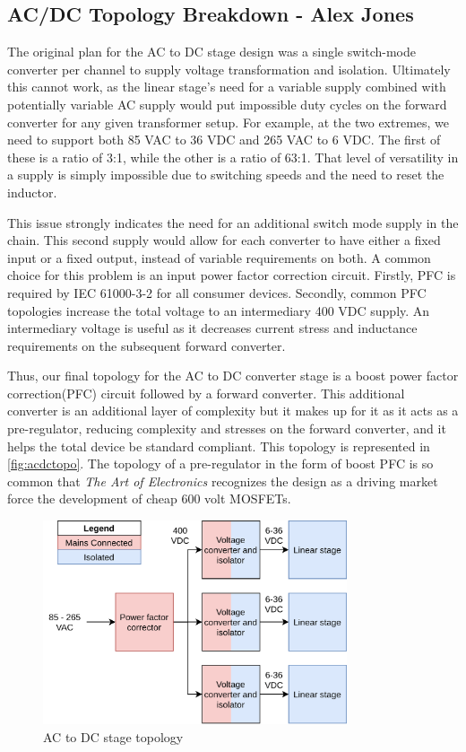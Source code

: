 \documentclass[15pt]{article}
\begin{document}
\pagebreak
\subsection{AC/DC Topology Breakdown - Alex Jones}
The original plan for the AC to DC stage design was a single switch-mode converter per channel to supply voltage transformation and isolation. Ultimately this cannot work, as the linear stage’s need for a variable supply combined with potentially variable AC supply would put impossible duty cycles on the forward converter for any given transformer setup. For example, at the two extremes, we need to support both 85 VAC to 36 VDC and 265 VAC to 6 VDC. The first of these is a ratio of 3:1, while the other is a ratio of 63:1. That level of versatility in a supply is simply impossible due to switching speeds and the need to reset the inductor.

This issue strongly indicates the need for an additional switch mode supply in the chain. This second supply would allow for each converter to have either a fixed input or a fixed output, instead of variable requirements on both. A common choice for this problem is an input power factor correction circuit. Firstly, PFC is required by IEC 61000-3-2 for all consumer devices. Secondly, common PFC topologies increase the total voltage to an intermediary 400 VDC supply. An intermediary voltage is useful as it decreases current stress and inductance requirements on the subsequent forward converter.

Thus, our final topology for the AC to DC converter stage is a boost power factor correction(PFC) circuit followed by a forward converter. This additional converter is an additional layer of complexity but it makes up for it as it acts as a pre-regulator, reducing complexity and stresses on the forward converter, and it helps the total device be standard compliant.  This topology is represented in \autoref{fig:acdctopo}. The topology of a pre-regulator in the form of boost PFC is so common that \emph{The Art of Electronics}\cite{aoe} recognizes the design as a driving market force the development of cheap 600 volt MOSFETs.

\begin{figure}[H]
    \centering
    \includegraphics[width=0.8\textwidth]{acdctopo}
    \caption{AC to DC stage topology}
    \label{fig:acdctopo}
\end{figure}
\end{document}
